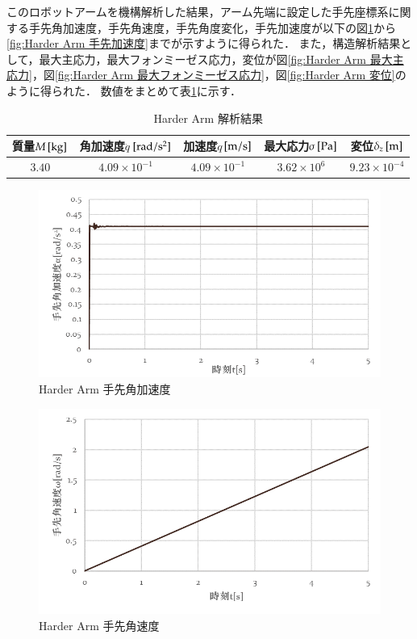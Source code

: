 \documentclass[10pt,b5paper,papersize,dvipdfmx]{jsbook}
\begin{document}
このロボットアームを機構解析した結果，アーム先端に設定した手先座標系に関する手先角加速度，手先角速度，手先角度変化，手先加速度が以下の図\ref{fig:Harder Arm 手先角加速度}から\ref{fig:Harder Arm 手先加速度}までが示すように得られた．
また，構造解析結果として，最大主応力，最大フォンミーゼス応力，変位が図\ref{fig:Harder Arm 最大主応力}，図\ref{fig:Harder Arm 最大フォンミーゼス応力}，図\ref{fig:Harder Arm 変位}のように得られた．
数値をまとめて表\ref{tbl:Harder Arm 解析結果}に示す．
\begin{table}[H]
  \centering
  \caption{Harder Arm 解析結果}
  \label{tbl:Harder Arm 解析結果}
  \begin{tabular}{|c|c|c|c|c|} \hline
    質量$M\tani*{kg}$& 角加速度$\ddot{q}$$\tani*{rad/s^2}$& 加速度$\dot{q}$$\tani*{m/s}$& 最大応力$\sigma\tani*{Pa}$& 変位$\delta_z\tani*{m}$\\ \hline
    $3.40$&$4.09\times 10^{-1}$&$4.09\times 10^{-1}$&$3.62\times 10^6$&$9.23\times 10^{-4}$\\ \hline
  \end{tabular}
\end{table}
%
\begin{figure}[H]
  \centering
  \includegraphics[width=.8\textwidth]{img/robot14.png}
  \caption{Harder Arm 手先角加速度}
  \label{fig:Harder Arm 手先角加速度}
\end{figure}
%
\begin{figure}[H]
  \centering
  \includegraphics[width=.8\textwidth]{img/robot15.png}
  \caption{Harder Arm 手先角速度}
  \label{fig:Harder Arm 手先角速度}
\end{figure}
%
\end{document}
